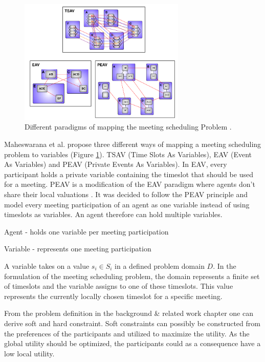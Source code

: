 \begin{figure}[h!]
\includegraphics[width=300px]{graphics/variablemodell.png}
\caption{Different paradigms of mapping the meeting scheduling Problem \cite{Maheswarana}.}
\label{fig:variablemapping}
\end{figure}
Maheswarana et al. propose three different ways of mapping a meeting scheduling problem to variables (Figure \ref{fig:variablemapping}). TSAV (Time Slots As Variables), EAV (Event As Variables) and PEAV (Private Events As Variables). In EAV, every participant holds a private variable containing the timeslot that should be used for a meeting. PEAV is a modification of the EAV paradigm where agents don't share their local valuations \cite{Maheswarana}. It was decided to follow the PEAV principle and model every meeting participation of an agent as one variable instead of using timeslots as variables. An agent therefore can hold multiple variables.
\begin{hardconstraint2}
Agent - holds one variable per meeting participation
\end{hardconstraint2}
\begin{hardconstraint2}
Variable - represents one meeting participation
\end{hardconstraint2}
A variable takes on a value \(s_{i} \in S_{i}\) in a defined problem domain \(D\). In the formulation of the meeting scheduling problem, the domain represents a finite set of timeslots and the variable assigns to one of these timeslots. This value represents the currently locally chosen timeslot for a specific meeting.

From the problem definition in the background \& related work chapter one can derive soft and hard constraint. Soft constraints can possibly be constructed from the preferences of the participants and utilized to maximize the utility. As the global utility should be optimized, the participants could as a consequence have a low local utility. 

